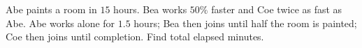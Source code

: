 Abe paints a room in $15$ hours. Bea works $50\%$ faster and Coe twice as fast as Abe. Abe works alone for $1.5$ hours; Bea then joins until half the room is painted; Coe then joins until completion. Find total elapsed minutes.
